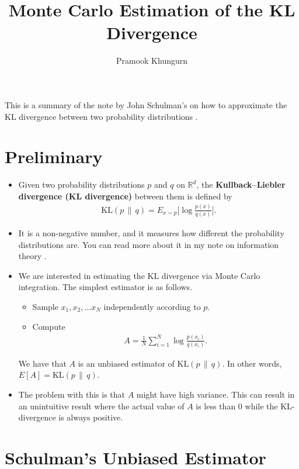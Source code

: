 \documentclass[10pt]{article}
\title{Monte Carlo Estimation of the KL Divergence}
\author{Pramook Khungurn}
\newcommand{\mrm}[1]{\mathrm{#1}}
\newcommand{\Real}{\mathbb{R}}
\begin{document}
\maketitle

This is a summary of the note by John Schulman's on how to approximate the KL divergence between two probability distributions \cite{Schulman:2020}.

\section{Preliminary}

\begin{itemize}
	\item Given two probability distributions $p$ and $q$ on $\Real^d$, the {\bf Kullback--Liebler divergence (KL divergence)} between them is defined by
	\begin{align*}
		\mrm{KL}(p\,\|\,q) = E_{x \sim p} \bigg[ \log \frac{p(x)}{q(x)} \bigg].
	\end{align*}
	
	\item It is a non-negative number, and it measures how different the probability distributions are. You can read more about it in my note on information theory \cite{Khungurn:InfoTheory}.
	
	\item We are interested in estimating the KL divergence via Monte Carlo integration. The simplest estimator is as follows.
	\begin{itemize}
		\item Sample $x_1, x_2, \dotsc x_N$ independently according to $p$.
		\item Compute
		\begin{align*}
			A = \frac{1}{N} \sum_{i=1}^N \log \frac{p(x_i)}{q(x_i)}.
		\end{align*}
	\end{itemize}
	We have that $A$ is an unbiased estimator of $\mrm{KL}(p\,\|\,q)$. In other words, $E[A] = \mrm{KL}(p\,\|\,q)$.

	\item The problem with this is that $A$ might have high variance. This can result in an unintuitive result where the actual value of $A$ is less than $0$ while the KL-divergence is always positive.	
\end{itemize}

\section{Schulman's Unbiased Estimator}
\end{document}
